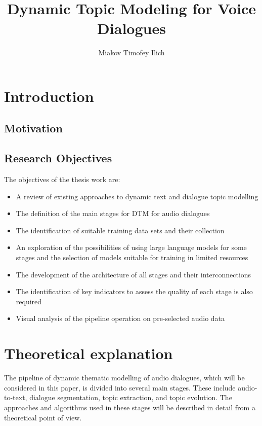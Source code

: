 \documentclass[PMI,VKR]{HSEUniversity}
\title{Dynamic Topic Modeling for Voice Dialogues}
\author{Miakov Timofey Ilich}
\begin{document}
\maketitle

\chapter{Introduction}

\section{Motivation}

\section{Research Objectives}
The objectives of the thesis work are:
\begin{itemize}
    \item A review of existing approaches to dynamic text and dialogue topic modelling
    \item The definition of the main stages for DTM for audio dialogues
    \item The identification of suitable training data sets and their collection
    \item An exploration of the possibilities of using large language models for some stages and the selection of models suitable for training in limited resources
    \item The development of the architecture of all stages and their interconnections
    \item The identification of key indicators to assess the quality of each stage is also required
    \item Visual analysis of the pipeline operation on pre-selected audio data
\end{itemize}


\chapter{Theoretical explanation}

The pipeline of dynamic thematic modelling of audio dialogues, which will be considered in this paper, is divided into several main stages. 
These include audio-to-text, dialogue segmentation, topic extraction, and topic evolution. 
The approaches and algorithms used in these stages will be described in detail from a theoretical point of view.
\end{document}
